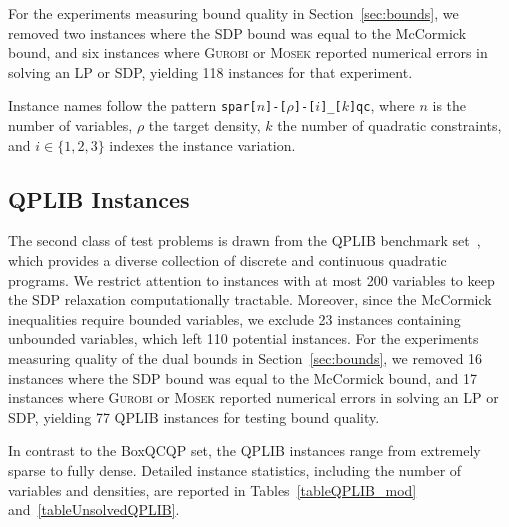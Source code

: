 \documentclass[twoside]{article}
\begin{document}
	For the experiments measuring bound quality in Section~\ref{sec:bounds}, we removed two instances where the SDP bound was equal to the McCormick bound, and six instances where \textsc{Gurobi} or \textsc{Mosek} reported numerical errors in solving an LP or SDP, yielding 118 instances for that experiment.
	
	Instance names follow the pattern \texttt{spar[$n$]-[$\rho$]-[$i$]\_[$k$]qc}, where $n$ is the number of variables, $\rho$ the target density, $k$ the number of quadratic constraints, and $i \in \{1, 2, 3\}$ indexes the instance variation. 
	
	\subsection*{QPLIB Instances}
	The second class of test problems is drawn from the QPLIB benchmark set~\cite{furini2019qplib}, which provides a diverse collection of discrete and continuous quadratic programs. We restrict attention to instances with at most 200 variables to keep the SDP relaxation computationally tractable. Moreover, since the McCormick inequalities require bounded variables, we exclude 23 instances containing unbounded variables, which left 110 potential instances.  For the experiments measuring quality of the dual bounds in Section~\ref{sec:bounds}, we removed 16 instances where the SDP bound was equal to the McCormick bound, and 17 instances where \textsc{Gurobi} or \textsc{Mosek} reported numerical errors in solving an LP or SDP, yielding 77 QPLIB instances for testing bound quality.
	
	In contrast to the BoxQCQP set, the QPLIB instances range from extremely sparse to fully dense. Detailed instance statistics, including the number of variables and densities, are reported in Tables~\ref{tableQPLIB_mod} and~\ref{tableUnsolvedQPLIB}.
	
	
	
\end{document}
